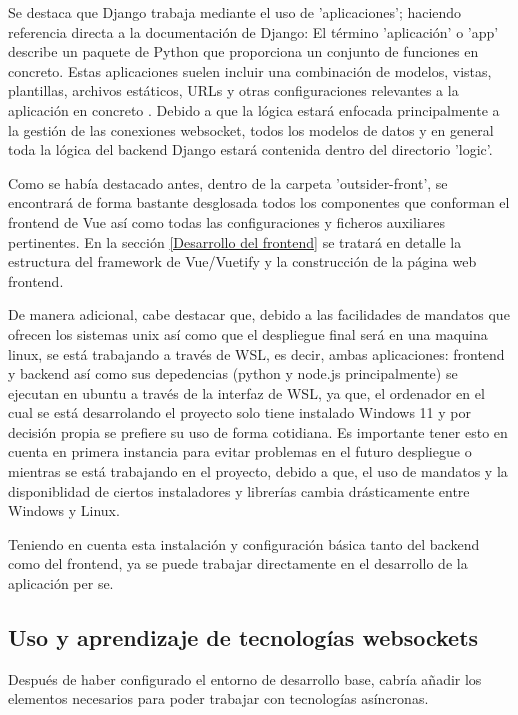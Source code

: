 Se destaca que Django trabaja mediante el uso de 'aplicaciones'; haciendo referencia directa a la documentación de Django: 
El término 'aplicación' o 'app' describe un paquete de Python que proporciona un conjunto de funciones en concreto. 
Estas aplicaciones suelen incluir una combinación de modelos, vistas, 
plantillas, archivos estáticos, URLs y otras configuraciones relevantes a la aplicación en concreto \cite{django}. Debido a que 
la lógica estará enfocada principalmente a la gestión de las conexiones websocket, todos los modelos de datos y en general toda 
la lógica del backend Django estará contenida dentro del directorio 'logic'.

Como se había destacado antes, dentro de la carpeta 'outsider-front', se encontrará de forma bastante desglosada todos los componentes
que conforman el frontend de Vue así como todas las configuraciones y ficheros auxiliares pertinentes. En la sección \ref{Desarrollo del frontend}
se tratará en detalle la estructura del framework de Vue/Vuetify y la construcción de la página web frontend.

De manera adicional, cabe destacar que, debido a las facilidades de mandatos que ofrecen los sistemas unix así como que el despliegue
final será en una maquina linux, se está trabajando a través de WSL, es decir,
ambas aplicaciones: frontend y backend así como sus depedencias (python y node.js principalmente) se ejecutan en ubuntu a través de la interfaz
de WSL, ya que, el ordenador en el cual se está desarrolando el proyecto solo tiene instalado Windows 11 y por decisión propia se prefiere su uso de forma
cotidiana. Es importante tener esto en cuenta en primera instancia para evitar problemas en el futuro despliegue o mientras se está trabajando en el proyecto,
debido a que, el uso de mandatos y la disponiblidad de ciertos instaladores y librerías cambia drásticamente entre Windows y Linux.

Teniendo en cuenta esta instalación y configuración básica tanto del backend como del frontend, ya se puede trabajar directamente en el desarrollo de
la aplicación per se.

\subsection{Uso y aprendizaje de tecnologías websockets} 

Después de haber configurado el entorno de desarrollo base, cabría añadir los elementos necesarios para poder 
trabajar con tecnologías asíncronas.

